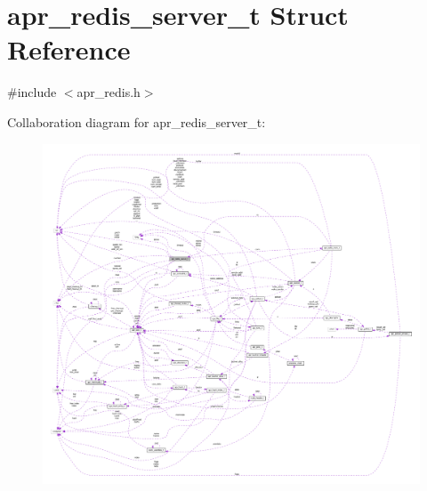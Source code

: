 \hypertarget{structapr__redis__server__t}{}\section{apr\+\_\+redis\+\_\+server\+\_\+t Struct Reference}
\label{structapr__redis__server__t}


{\ttfamily \#include $<$apr\+\_\+redis.\+h$>$}



Collaboration diagram for apr\+\_\+redis\+\_\+server\+\_\+t\+:
\nopagebreak
\begin{figure}[H]
\begin{center}
\leavevmode
\includegraphics[width=350pt]{structapr__redis__server__t__coll__graph}
\end{center}
\end{figure}
